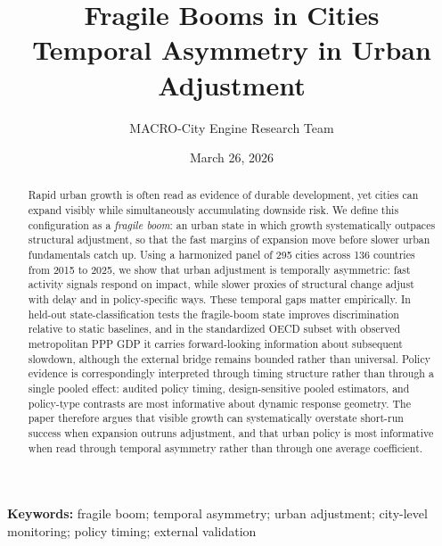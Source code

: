 \documentclass[11pt,a4paper]{article}
\title{Fragile Booms in Cities\\[4pt]
\large Temporal Asymmetry in Urban Adjustment}
\author{MACRO-City Engine Research Team}
\date{March 26, 2026}
\begin{document}
\maketitle

\raggedbottom
\setcounter{topnumber}{4}
\setcounter{bottomnumber}{3}
\setcounter{totalnumber}{6}
\renewcommand{\topfraction}{0.9}
\renewcommand{\bottomfraction}{0.85}
\renewcommand{\textfraction}{0.06}
\renewcommand{\floatpagefraction}{0.72}
\setlength{\textfloatsep}{10pt plus 2pt minus 2pt}
\setlength{\floatsep}{8pt plus 2pt minus 2pt}
\setlength{\intextsep}{8pt plus 2pt minus 2pt}

\renewcommand{\dblfloatpagefraction}{0.7}
\setlength{\dbltextfloatsep}{8pt plus 2pt minus 2pt}

\begin{abstract}
Rapid urban growth is often read as evidence of durable development, yet cities can expand visibly while simultaneously accumulating downside risk.
We define this configuration as a \emph{fragile boom}: an urban state in which growth systematically outpaces structural adjustment, so that the fast margins of expansion move before slower urban fundamentals catch up.
Using a harmonized panel of 295 cities across 136 countries from 2015 to 2025, we show that urban adjustment is temporally asymmetric: fast activity signals respond on impact, while slower proxies of structural change adjust with delay and in policy-specific ways.
These temporal gaps matter empirically. In held-out state-classification tests the fragile-boom state improves discrimination relative to static baselines, and in the standardized OECD subset with observed metropolitan PPP GDP it carries forward-looking information about subsequent slowdown, although the external bridge remains bounded rather than universal.
Policy evidence is correspondingly interpreted through timing structure rather than through a single pooled effect: audited policy timing, design-sensitive pooled estimators, and policy-type contrasts are most informative about dynamic response geometry.
The paper therefore argues that visible growth can systematically overstate short-run success when expansion outruns adjustment, and that urban policy is most informative when read through temporal asymmetry rather than through one average coefficient.
\end{abstract}
\noindent\textbf{Keywords:} fragile boom; temporal asymmetry; urban adjustment; city-level monitoring; policy timing; external validation
\end{document}
